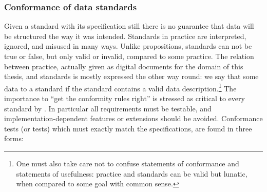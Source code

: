 \subsubsection{Conformance of data standards}
\label{sec:dsconf}

Given a standard with its specification still there is no guarantee that data
will be structured the way it was intended. Standards in practice are
interpreted, ignored, and misused in many ways. Unlike propositions, standards
can not be true or false, but only valid or invalid, compared to some practice.
The relation between practice, actually given as digital documents for the
domain of this thesis, and standards is mostly expressed the other way round: we
say that some data  to a standard if the standard
contains a valid data description.\footnote{One must also take care not to confuse
statements of conformance and statements of usefulness: practice and standards
can be valid but lunatic, when compared to some goal with common sense.} The
importance to ``get the conformity rules right'' is stressed as critical to
every standard by \textcite{Meek1995}. In particular all requirements must be
testable, and implementation-dependent features or extensions should be
avoided.  Conformance tests (or  tests) which must exactly
match the specifications, are found in three forms:

